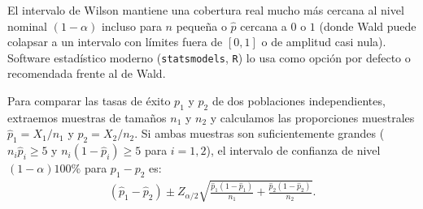 \begin{observacion}
	El intervalo de Wilson mantiene una cobertura real mucho más cercana al nivel nominal $(1-\alpha)$ incluso para $n$ pequeña o $\hat p$ cercana a $0$ o $1$ (donde Wald puede colapsar a un intervalo con límites fuera de $[0,1]$ o de amplitud casi nula). Software estadístico moderno (\texttt{statsmodels}, \texttt{R}) lo usa como opción por defecto o recomendada frente al de Wald.
\end{observacion}

\begin{teorema}
	Para comparar las tasas de éxito $p_1$ y $p_2$ de dos poblaciones independientes, extraemos muestras de tamaños $n_1$ y $n_2$ y calculamos las proporciones muestrales $\hat{p}_1 = X_1/n_1$ y $\hat{p}_2 = X_2/n_2$. Si ambas muestras son suficientemente grandes ($n_i\hat{p}_i \geq 5$ y $n_i(1-\hat{p}_i) \geq 5$ para $i=1,2$), el intervalo de confianza de nivel $(1-\alpha)100\%$ para $p_1 - p_2$ es:
	\begin{align}
		(\hat{p}_1 - \hat{p}_2) \pm Z_{\alpha/2} \sqrt{\frac{\hat{p}_1(1-\hat{p}_1)}{n_1} + \frac{\hat{p}_2(1-\hat{p}_2)}{n_2}}.
	\end{align}
\end{teorema}

